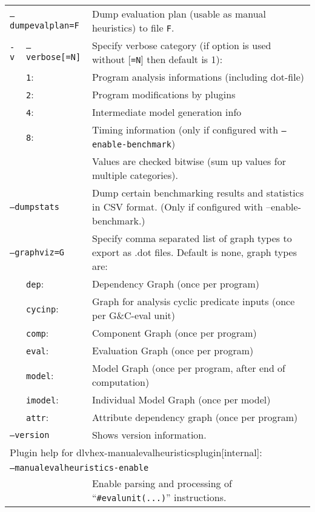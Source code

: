 \documentclass[a4paper, titlepage]{article}
\begin{document}
\begin{longtable}{ p{2.0em} p{2.2cm} p{0.6cm} p{8.0cm} } 
\multicolumn{3}{l}{\texttt{--dumpevalplan=F}} &
  Dump evaluation plan (usable as manual heuristics) to file \texttt{F}.\\
\texttt{-v}& \multicolumn{2}{l}{\texttt{--verbose[=N]}} &
  Specify verbose category (if option is used without [\texttt{=N}] then default is 1):\\
&\texttt{1}:&& Program analysis informations (including dot-file)\\
&\texttt{2}:&& Program modifications by plugins\\
&\texttt{4}:&& Intermediate model generation info\\
&\texttt{8}:&& Timing information (only if configured with \texttt{\texttt{--enable-benchmark}})\\
&&&Values are checked bitwise (sum up values for multiple categories).\\
\multicolumn{3}{l}{\texttt{--dumpstats}} &
  Dump certain benchmarking results and statistics in CSV format. (Only if configured with --enable-benchmark.)\\
\multicolumn{3}{l}{\texttt{--graphviz=G}} &
  Specify comma separated list of graph types to export as .dot files. Default is none, graph types are:\\
&\texttt{dep}:&& Dependency Graph (once per program)\\
&\texttt{cycinp}:&& Graph for analysis cyclic predicate inputs (once per G\&C-eval unit)\\
&\texttt{comp}:&& Component Graph (once per program)\\
&\texttt{eval}:&& Evaluation Graph (once per program)\\
&\texttt{model}:&& Model Graph (once per program, after end of computation)\\
&\texttt{imodel}:&& Individual Model Graph (once per model)\\
&\texttt{attr}:&& Attribute dependency graph (once per program)\\
\multicolumn{3}{l}{\texttt{--version}} &
  Shows version information.\\
\multicolumn{4}{l}{Plugin help for dlvhex-manualevalheuristicsplugin[internal]:}\\
\multicolumn{4}{l}{\texttt{--manualevalheuristics-enable}}\\
& & & Enable parsing and processing of ``\texttt{\#evalunit(...)}'' instructions.\\

\end{longtable}
\end{document}
